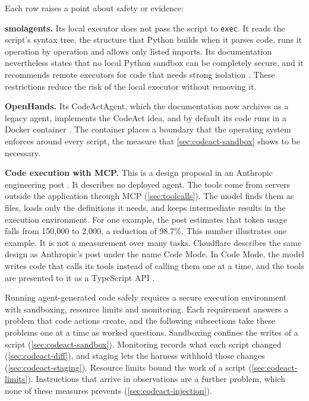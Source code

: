 Each row raises a point about safety or evidence:
\bi
\item \textbf{smolagents.} Its local executor does not pass the script to \texttt{exec}. It reads
the script's syntax tree, the structure that Python builds when it parses code, runs it operation
by operation and allows only listed imports. Its documentation nevertheless states that no local
Python sandbox can be completely secure, and it recommends remote executors for code that needs
strong isolation \citep{smolagents-secure-execution}. These restrictions reduce the risk of the
local executor without removing it.
\item \textbf{OpenHands.} Its CodeActAgent, which the documentation now archives as a legacy agent,
implements the CodeAct idea, and by default its code runs in a Docker container
\citep{openhands-docs}. The container places a boundary that the operating system enforces around
every script, the measure that \cref{sec:codeact-sandbox} shows to be necessary.
\item \textbf{Code execution with MCP.} This is a design proposal in an Anthropic engineering post
\citep{jones2025codeexecmcp}. It describes no deployed agent. The tools come from servers
outside the application through MCP (\cref{sec:toolcalls}). The model finds them as files, loads
only the definitions it needs, and keeps intermediate results in the execution environment. For
one example, the post estimates that token usage falls from 150,000 to 2,000, a reduction of
98.7\%. This number illustrates one example. It is not a measurement over many tasks.
\ei
Cloudflare describes the same design as Anthropic's post under the name Code Mode. In Code Mode, the
model writes code that calls its tools instead of calling them one at a time, and the tools are
presented to it as a TypeScript API \citep{varda2025codemode}.

Running agent-generated code safely requires a secure execution environment with sandboxing,
resource limits and monitoring. Each requirement answers a problem that code actions create, and
the following subsections take these problems one at a time as worked questions. Sandboxing
confines the writes of a script (\cref{sec:codeact-sandbox}). Monitoring records what each script
changed (\cref{sec:codeact-diff}), and staging lets the harness withhold those changes
(\cref{sec:codeact-staging}). Resource limits bound the work of a script
(\cref{sec:codeact-limits}). Instructions that arrive in observations are a further problem, which
none of these measures prevents (\cref{sec:codeact-injection}).

